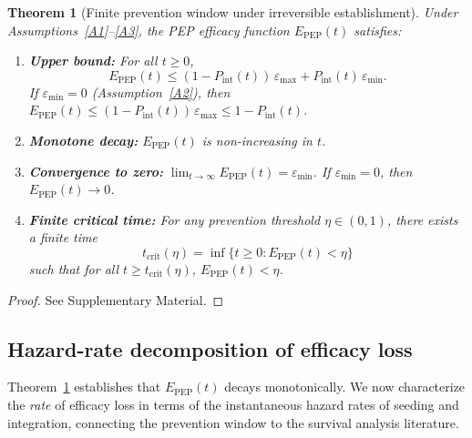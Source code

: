 \documentclass[12pt,a4paper]{article}
\theoremstyle{plain}
\newtheorem{theorem}{Theorem}[section]
\theoremstyle{definition}
\theoremstyle{remark}
\newcommand{\Pint}{P_{\mathrm{int}}}
\newcommand{\Epep}{E_{\mathrm{PEP}}}
\newcommand{\tcrit}{t_{\mathrm{crit}}}
\begin{document}
\begin{theorem}[Finite prevention window under irreversible establishment]\label{thm:main}
Under Assumptions~\ref{A1}--\ref{A3}, the PEP efficacy function $\Epep(t)$ satisfies:
\begin{enumerate}
    \item[(i)] \textbf{Upper bound:} For all $t \geq 0$,
    \begin{equation}\label{eq:upper-bound}
        \Epep(t) \leq (1 - \Pint(t))\,\varepsilon_{\max} + \Pint(t)\,\varepsilon_{\min}.
    \end{equation}
    If $\varepsilon_{\min} = 0$ (Assumption~\ref{A2}), then $\Epep(t) \leq (1 - \Pint(t))\,\varepsilon_{\max} \leq 1 - \Pint(t)$.
    
    \item[(ii)] \textbf{Monotone decay:} $\Epep(t)$ is non-increasing in $t$.
    
    \item[(iii)] \textbf{Convergence to zero:} $\displaystyle\lim_{t \to \infty} \Epep(t) = \varepsilon_{\min}$. If $\varepsilon_{\min} = 0$, then $\Epep(t) \to 0$.
    
    \item[(iv)] \textbf{Finite critical time:} For any prevention threshold $\eta \in (0, 1)$, there exists a finite time
    \begin{equation}\label{eq:tcrit}
        \tcrit(\eta) = \inf\{t \geq 0 : \Epep(t) < \eta\}
    \end{equation}
    such that for all $t \geq \tcrit(\eta)$, $\Epep(t) < \eta$.
\end{enumerate}
\end{theorem}

\begin{proof}
See Supplementary Material.
\end{proof}



\subsection{Hazard-rate decomposition of efficacy loss}\label{sec:hazard}

Theorem~\ref{thm:main} establishes that $\Epep(t)$ decays monotonically. We now characterize the \emph{rate} of efficacy loss in terms of the instantaneous hazard rates of seeding and integration, connecting the prevention window to the survival analysis literature.
\end{document}

